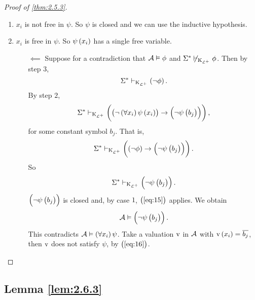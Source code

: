 \begin{proof}[Proof of \ref{thm:2.5.3}]
\begin{enumerate}[leftmargin=0.5in, label=Step \arabic*.]
\begin{itemize}
\begin{enumerate}[leftmargin=0.5in, label=Case \arabic*.]
\begin{enumerate}[leftmargin=0.5in, label=Case 3\alph*.]
\item $ x_i $ is not free in $ \psi $. So $ \psi $ is closed and we can use the inductive hypothesis.
\item $ x_i $ is free in $ \psi $. So $ \psi\br{x_i} $ has a single free variable.
\begin{itemize}
\item[$ \impliedby $] Suppose for a contradiction that $ \mathcal{A} \vDash \phi $ and $ \Sigma^* \not\vdash_{\mathrm{K}_{\mathcal{L}^+}} \phi $. Then by step $ 3 $,
$$ \Sigma^* \vdash_{\K_{\LLL^+}} \notb{\phi}. $$
By step $ 2 $,
$$ \Sigma^* \vdash_{\K_{\LLL^+}} \impb{\notb{\fab{x_i}\psi\br{x_i}}}{\notb{\psi\br{b_j}}}, $$
for some constant symbol $ b_j $. That is,
$$ \Sigma^* \vdash_{\K_{\LLL^+}} \impb{\notb{\phi}}{\notb{\psi\br{b_j}}}. $$
So
$$ \Sigma^* \vdash_{\K_{\LLL^+}} \notb{\psi\br{b_j}}. $$
$ \notb{\psi\br{b_j}} $ is closed and, by case $ 1 $, $ \br{\ref{eq:15}} $ applies. We obtain
\begin{equation}
\label{eq:16}
\AAA \vDash \notb{\psi\br{b_j}}.
\end{equation}
This contradicts $ \AAA \vDash \fab{x_i}\psi $. Take a valuation $ \mathrm{v} $ in $ \mathcal{A} $ with $ \v\br{x_i} = \overline{b_j} $, then $ \mathrm{v} $ does not satisfy $ \psi $, by $ \br{\ref{eq:16}} $.
\end{itemize}
\end{enumerate}
\end{enumerate}
\end{itemize}
\end{enumerate}
\end{proof}

\pagebreak

\subsection{Lemma \ref{lem:2.6.3}}

